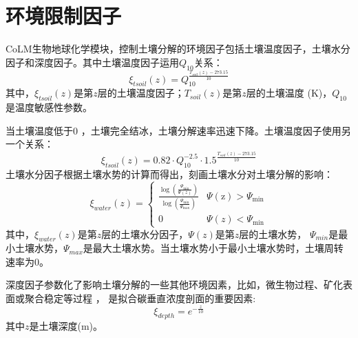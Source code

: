 \section{环境限制因子}\label{环境限制因子}
CoLM生物地球化学模块，控制土壤分解的环境因子包括土壤温度因子，土壤水分因子和深度因子。其中土壤温度因子运用$Q_{10}$关系：
\begin{equation}
\xi_{t s o i l}(z)=Q_{10}^{\frac{T_{{soil }}(z)-273.15}{10}}
\end{equation}
其中，$\xi_{tsoil}\left(z\right)$是第$z$层的土壤温度因子；$T_{soil}\left(z\right)$是第$z$层的土壤温度 (K)，$Q_{10}$是温度敏感性参数。


当土壤温度低于0 \textcelsius，土壤完全结冰，土壤分解速率迅速下降。土壤温度因子使用另一个关系：
\begin{equation}
\xi_{t s o i l}(z)=0.82 \cdot Q_{10}^{-2.5} \cdot 1.5^{\frac{T_{{soil }}(z)-273.15}{10}}
\end{equation}
土壤水分因子根据土壤水势的计算而得出，刻画土壤水分对土壤分解的影响：
\begin{equation}
\xi_{w a t e r}(z)=\left\{\begin{array}{ll}\frac{\log \left(\frac{\Psi_{\min }}{\Psi(z)}\right)}{\log \left(\frac{\Psi_{\min }}{\Psi_{\max }}\right)} 
    & \Psi(\mathrm{z})>\Psi_{\min } \\ 0  & \Psi(z)<\Psi_{\min }\end{array}\right.
\end{equation}
其中，$\xi_{water}\left(z\right)$是第$z$层的土壤水分因子，$\Psi\left(z\right)$是第$z$层的土壤水势，
$\Psi_{min}$是最小土壤水势，$\Psi_{max}$是最大土壤水势。当土壤水势小于最小土壤水势时，土壤周转速率为0。


深度因子参数化了影响土壤分解的一些其他环境因素，比如，微生物过程、矿化表面或聚合稳定等过程 \citep{koven2013effect}，
是拟合碳垂直浓度剖面的重要因素\citep{jenkinson2008turnover}:
\begin{equation}
\xi_{d e p t h}=e^{-\frac{z}{10}}
\end{equation}
其中$z$是土壤深度(m)。

